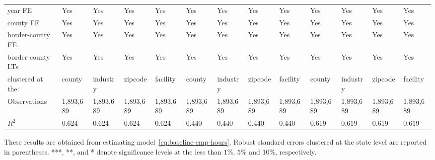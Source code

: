 \begin{table}[H]
{\begin{tabular}{@{}lllllllllllll@{}}
            year FE              & Yes       & Yes       & Yes       & Yes       & Yes       & Yes       & Yes       & Yes       & Yes       & Yes       & Yes       & Yes       \\
            county FE            & Yes       & Yes       & Yes       & Yes       & Yes       & Yes       & Yes       & Yes       & Yes       & Yes       & Yes       & Yes       \\
            border-county FE     & Yes       & Yes       & Yes       & Yes       & Yes       & Yes       & Yes       & Yes       & Yes       & Yes       & Yes       & Yes       \\
            border-county LTs    & Yes       & Yes       & Yes       & Yes       & Yes       & Yes       & Yes       & Yes       & Yes       & Yes       & Yes       & Yes       \\\midrule
            clustered at the:    & county    & industry  & zipcode   & facility  & county    & industry  & zipcode   & facility  & county    & industry  & zipcode   & facility  \\
            Observations         & 1,893,689 & 1,893,689 & 1,893,689 & 1,893,689 & 1,893,689 & 1,893,689 & 1,893,689 & 1,893,689 & 1,893,689 & 1,893,689 & 1,893,689 & 1,893,689 \\
            $R^2$                & 0.624     & 0.624     & 0.624     & 0.624     & 0.440     & 0.440     & 0.440     & 0.440     & 0.619     & 0.619     & 0.619     & 0.619     \\ \bottomrule \bottomrule
        \end{tabular}%
    }
    \begin{minipage}{18cm}
        \vspace{0.05in}
        These results are obtained from estimating model~\ref{eq:baseline-emp-hours}. Robust standard errors clustered at the state level are reported in parentheses. ***, **, and * denote significance levels at the less than $1\%$, $5\%$ and $10\%$, respectively.
    \end{minipage}
\end{table}